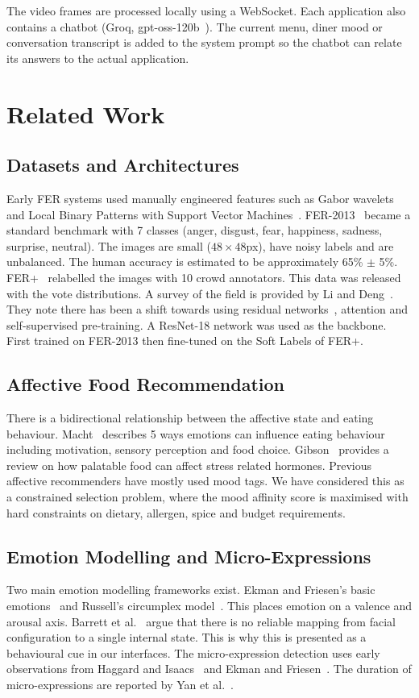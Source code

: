 \documentclass[conference]{IEEEtran}
\begin{document}
The video frames are processed locally using a WebSocket. Each application also contains a chatbot (Groq, gpt-oss-120b~\cite{gptoss}). The current menu, diner mood or conversation transcript is added to the system prompt so the chatbot can relate its answers to the actual application.

\section{Related Work}
\subsection{Datasets and Architectures}
Early FER systems used manually engineered features such as Gabor wavelets and Local Binary Patterns with Support Vector Machines~\cite{pantic}. FER-2013~\cite{goodfellow} became a standard benchmark with 7 classes (anger, disgust, fear, happiness, sadness, surprise, neutral). The images are small ($48\times48$px), have noisy labels and are unbalanced. The human accuracy is estimated to be approximately 65\% $\pm$ 5\%. FER+~\cite{barsoum} relabelled the images with 10 crowd annotators. This data was released with the vote distributions. A survey of the field is provided by Li and Deng~\cite{li}. They note there has been a shift towards using residual networks~\cite{he}, attention and self-supervised pre-training. A ResNet-18 network was used as the backbone. First trained on FER-2013 then fine-tuned on the Soft Labels of FER+.

\subsection{Affective Food Recommendation}
There is a bidirectional relationship between the affective state and eating behaviour. Macht~\cite{macht} describes 5 ways emotions can influence eating behaviour including motivation, sensory perception and food choice. Gibson~\cite{gibson} provides a review on how palatable food can affect stress related hormones. Previous affective recommenders have mostly used mood tags. We have considered this as a constrained selection problem, where the mood affinity score is maximised with hard constraints on dietary, allergen, spice and budget requirements.

\subsection{Emotion Modelling and Micro-Expressions}
Two main emotion modelling frameworks exist. Ekman and Friesen's basic emotions~\cite{ekman71} and Russell's circumplex model~\cite{russell}. This places emotion on a valence and arousal axis. Barrett et al.~\cite{barrett} argue that there is no reliable mapping from facial configuration to a single internal state. This is why this is presented as a behavioural cue in our interfaces. The micro-expression detection uses early observations from Haggard and Isaacs~\cite{haggard} and Ekman and Friesen~\cite{ekman69}. The duration of micro-expressions are reported by Yan et al.~\cite{yan}.
\end{document}
